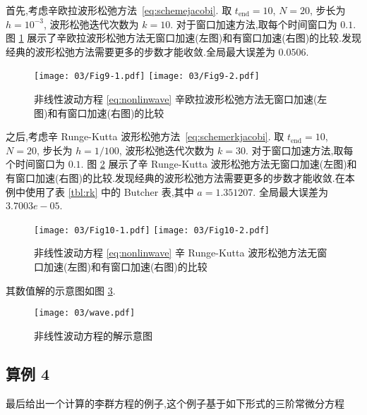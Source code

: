 首先,考虑辛欧拉波形松弛方法~\eqref{eq:schemejacobi}. 取 $t_{\text{end}} = 10$, $N=20$, 步长为 $h = 10^{-3}$, 波形松弛迭代次数为 $k=10$. 对于窗口加速方法,取每个时间窗口为 $0.1$. 图 \ref{fig:ex3seucom} 展示了辛欧拉波形松弛方法无窗口加速(左图)和有窗口加速(右图)的比较.发现经典的波形松弛方法需要更多的步数才能收敛.全局最大误差为 $0.0506$.

\begin{figure}[h!]
  \centering
  \texttt{[image: 03/Fig9-1.pdf]}
  \texttt{[image: 03/Fig9-2.pdf]}
  \caption{非线性波动方程 \eqref{eq:nonlinwave} 辛欧拉波形松弛方法无窗口加速(左图)和有窗口加速(右图)的比较}
  \label{fig:ex3seucom}
\end{figure}

之后,考虑辛 Runge-Kutta 波形松弛方法~\eqref{eq:schemerkjacobi}. 取 $t_{\text{end}} = 10$, $N=20$, 步长为 $h = 1/100$, 波形松弛迭代次数为 $k=30$. 对于窗口加速方法,取每个时间窗口为 $0.1$. 图 \ref{fig:ex3srkcom} 展示了辛 Runge-Kutta 波形松弛方法无窗口加速(左图)和有窗口加速(右图)的比较.发现经典的波形松弛方法需要更多的步数才能收敛.在本例中使用了表 \ref{tbl:rk} 中的 Butcher 表,其中 $a = 1.351207$. 全局最大误差为 $3.7003e-05$.

\begin{figure}[h!]
  \centering
  \texttt{[image: 03/Fig10-1.pdf]}
  \texttt{[image: 03/Fig10-2.pdf]}
  \caption{非线性波动方程 \eqref{eq:nonlinwave} 辛 Runge-Kutta 波形松弛方法无窗口加速(左图)和有窗口加速(右图)的比较}
  \label{fig:ex3srkcom}
\end{figure}

其数值解的示意图如图 \ref{fig:wavefig}.

\begin{figure}[h!]
  \centering
  \texttt{[image: 03/wave.pdf]}
  \caption{非线性波动方程的解示意图}
  \label{fig:wavefig}
\end{figure}

\subsection*{算例 4}
最后给出一个计算的李群方程的例子,这个例子基于如下形式的三阶常微分方程

